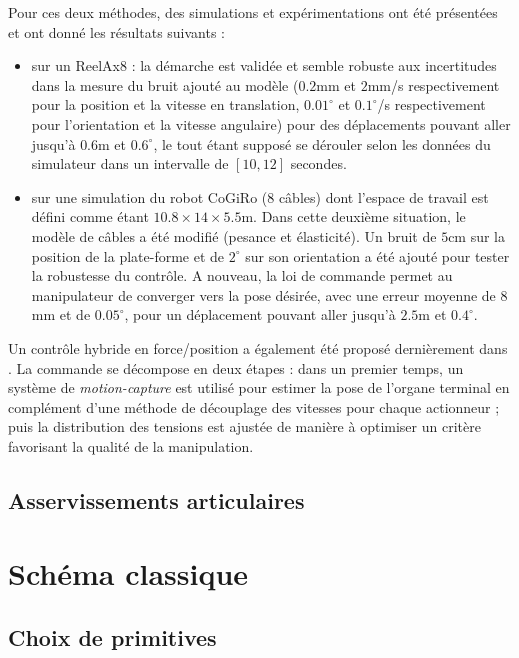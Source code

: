 Pour ces deux méthodes, des simulations et expérimentations ont été présentées et ont donné les résultats suivants :
\begin{itemize}
 \item sur un ReelAx8 : la démarche est validée et semble robuste aux incertitudes dans la mesure du bruit ajouté au modèle ($0.2$mm et $2$mm/s respectivement pour la position et la vitesse en translation, $0.01^{\circ}$ et $0.1^{\circ}$/s respectivement pour l'orientation et la vitesse angulaire) pour des déplacements pouvant aller jusqu'à $0.6$m et $0.6^{\circ}$, le tout étant supposé se dérouler selon les données du simulateur dans un intervalle de $[10,12]$ secondes.
  \item sur une simulation du robot CoGiRo (8 câbles) dont l'espace de travail est défini comme étant $10.8 \times 14 \times 5.5$m. Dans cette deuxième situation, le modèle de câbles a été modifié (pesance et élasticité). Un bruit de $5$cm sur la position de la plate-forme et de $2^{\circ}$ sur son orientation a été ajouté pour tester la robustesse du contrôle. A nouveau, la loi de commande permet au manipulateur de converger vers la pose désirée, avec une erreur moyenne de $8$mm et de $0.05^{\circ}$, pour un déplacement pouvant aller jusqu'à $2.5$m et $0.4^{\circ}$. 
\end{itemize}

Un contrôle hybride en force/position a également été proposé dernièrement dans  \cite{chellal2015} \cite{chellal2014}. La commande se décompose en deux étapes : dans un premier temps, un système de {\it motion-capture} est utilisé pour estimer la pose de l'organe terminal en complément d'une méthode de découplage des vitesses pour chaque actionneur ; puis la distribution des tensions est ajustée de manière à optimiser un critère favorisant la qualité de la manipulation.

\subsection{Asservissements articulaires}




\section{Sch\'ema classique}

\subsection{Choix de primitives}

